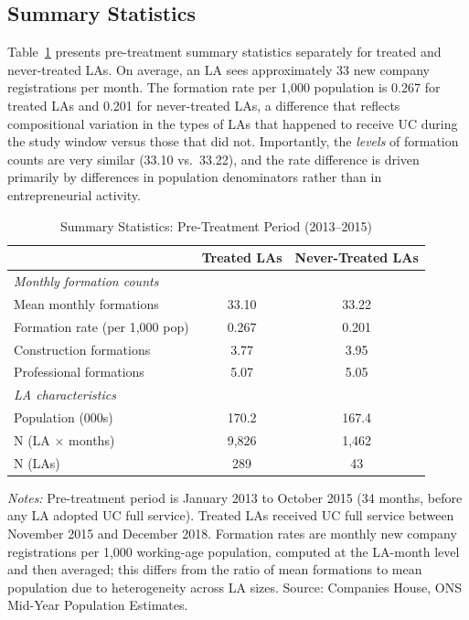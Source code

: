 \documentclass[12pt]{article}
\begin{document}
\subsection{Summary Statistics}

Table~\ref{tab:summary} presents pre-treatment summary statistics separately for treated and never-treated LAs. On average, an LA sees approximately 33 new company registrations per month. The formation rate per 1,000 population is 0.267 for treated LAs and 0.201 for never-treated LAs, a difference that reflects compositional variation in the types of LAs that happened to receive UC during the study window versus those that did not. Importantly, the \textit{levels} of formation counts are very similar (33.10 vs.\ 33.22), and the rate difference is driven primarily by differences in population denominators rather than in entrepreneurial activity.

\begin{table}[t]
\centering
\caption{Summary Statistics: Pre-Treatment Period (2013--2015)}
\label{tab:summary}
\begin{threeparttable}
\begin{tabular}{lcc}
\toprule
& Treated LAs & Never-Treated LAs \\
\midrule
\textit{Monthly formation counts} & & \\
Mean monthly formations & 33.10 & 33.22 \\
Formation rate (per 1,000 pop) & 0.267 & 0.201 \\
Construction formations & 3.77 & 3.95 \\
Professional formations & 5.07 & 5.05 \\
\midrule
\textit{LA characteristics} & & \\
Population (000s) & 170.2 & 167.4 \\
\midrule
N (LA $\times$ months) & 9,826 & 1,462 \\
N (LAs) & 289 & 43 \\
\bottomrule
\end{tabular}
\begin{tablenotes}
\small
\item \textit{Notes:} Pre-treatment period is January 2013 to October 2015 (34 months, before any LA adopted UC full service). Treated LAs received UC full service between November 2015 and December 2018. Formation rates are monthly new company registrations per 1,000 working-age population, computed at the LA-month level and then averaged; this differs from the ratio of mean formations to mean population due to heterogeneity across LA sizes. Source: Companies House, ONS Mid-Year Population Estimates.
\end{tablenotes}
\end{threeparttable}
\end{table}
\end{document}
